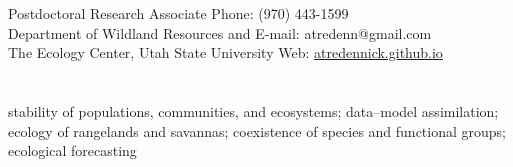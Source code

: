 \documentclass[margin,line]{resume}
\begin{document}
\begin{resume}

    \section{\textmd{\textsf{\color{MidnightBlue}{Contact\\Information}}}}

    Postdoctoral Research Associate      							 \hfill Phone: (970) 443-1599            \vspace{0mm}\\\vspace{0mm}%
    Department of Wildland Resources and    		          \hfill E-mail: atredenn@gmail.com    \vspace{0mm}\\\vspace{0mm}%
    The Ecology Center, Utah State University      	          \hfill Web: \href{http://atredennick.github.io}{atredennick.github.io}  \vspace{0mm}\\\vspace{-4.5mm}%

    \section{\textmd{\textsf{\color{MidnightBlue}{Research\\Interests}}}}
		stability of populations, communities, and ecosystems; data--model assimilation; ecology of rangelands and savannas; coexistence of species and functional groups; ecological forecasting %

\end{resume}
\end{document}
